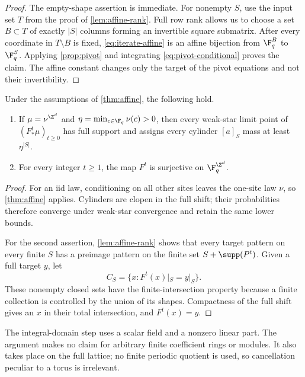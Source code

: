 \begin{proof}
The empty-shape assertion is immediate.  For nonempty $S$, use the input set
$T$ from the proof of \cref{lem:affine-rank}.  Full row rank allows us to
choose a set $B\subset T$ of exactly $|S|$ columns forming an invertible
square submatrix.  After every coordinate in $T\setminus B$ is fixed,
\eqref{eq:iterate-affine} is an affine bijection from $\F_q^B$ to
$\F_q^S$.  Applying \cref{prop:pivot} and integrating
\eqref{eq:pivot-conditional} proves the claim.  The affine constant changes
only the target of the pivot equations and not their invertibility.
\end{proof}

\begin{corollary}\label{cor:affine-consequences}
Under the assumptions of \cref{thm:affine}, the following hold.
\begin{enumerate}[label=\textup{(\alph*)}]
  \item If $\mu=\nu^{\Z^d}$ and
  $\eta=\min_{c\in\F_q}\nu(c)>0$, then every weak-star limit point of
  $(F^t_*\mu)_{t\geq0}$ has full support and assigns every cylinder
  $[a]_S$ mass at least $\eta^{|S|}$.
  \item For every integer $t\geq1$, the map $F^t$ is surjective on
  $\F_q^{\Z^d}$.
\end{enumerate}
\end{corollary}

\begin{proof}
For an iid law, conditioning on all other sites leaves the one-site law
$\nu$, so \cref{thm:affine} applies.  Cylinders are clopen in the full shift;
their probabilities therefore converge under weak-star convergence and
retain the same lower bounds.

For the second assertion, \cref{lem:affine-rank} shows that every target
pattern on every finite $S$ has a preimage pattern on the finite set
$S+\supp(P^t)$.  Given a full target $y$, let
\[
  C_S=\{x:F^t(x)|_S=y|_S\}.
\]
These nonempty closed sets have the finite-intersection property because a
finite collection is controlled by the union of its shapes.  Compactness of
the full shift gives an $x$ in their total intersection, and $F^t(x)=y$.
\end{proof}

\begin{remark}\label{rem:affine-scope}
The integral-domain step uses a scalar field and a nonzero linear part.  The
argument makes no claim for arbitrary finite coefficient rings or modules.
It also takes place on the full lattice; no finite periodic quotient is used,
so cancellation peculiar to a torus is irrelevant.
\end{remark}
